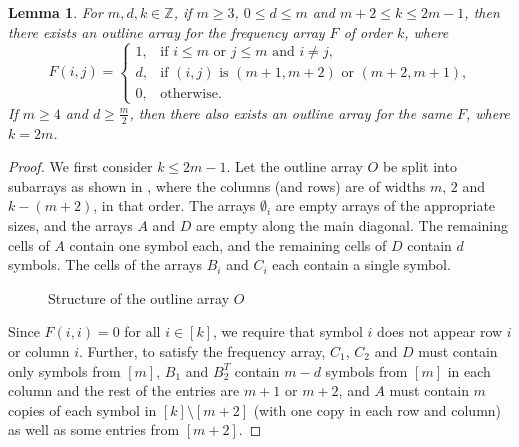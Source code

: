 \documentclass[preprint,nonatbib]{elsarticle}
\newtheorem{lemma}[theorem]{Lemma}
\theoremstyle{definition}
\numberwithin{equation}{section}
\begin{document}
\begin{lemma}
\label{lemma: freq array with d in corner}
    For $m,d,k\in\mathbb{Z}$, if $m\geq 3$, $0\leq d\leq m$ and $m+2\leq k\leq 2m-1$, then there exists an outline array for the frequency array $F$ of order $k$, where
    $$F(i,j) = \begin{cases}
        1, & \text{if $i\leq m$ or $j\leq m$ and $i\neq j$,}\\
        d, & \text{if $(i,j)$ is $(m+1,m+2)$ or $(m+2,m+1)$,}\\
        0, & \text{otherwise.}
    \end{cases}$$
    If $m\geq 4$ and $d\geq \frac{m}{2}$, then there also exists an outline array for the same $F$, where $k=2m$.
\end{lemma}
\begin{proof}
    We first consider $k\leq 2m-1$. Let the outline array $O$ be split into subarrays as shown in , where the columns (and rows) are of widths $m$, $2$ and $k-(m+2)$, in that order. The arrays $\emptyset_i$ are empty arrays of the appropriate sizes, and the arrays $A$ and $D$ are empty along the main diagonal. The remaining cells of $A$ contain one symbol each, and the remaining cells of $D$ contain $d$ symbols. The cells of the arrays $B_i$ and $C_i$ each contain a single symbol.
    \begin{figure}[h]
        \centering
        \caption{Structure of the outline array $O$}
        \label{fig: split outline array}
    \end{figure}

    Since $F(i,i) = 0$ for all $i\in[k]$, we require that symbol $i$ does not appear row $i$ or column $i$. Further, to satisfy the frequency array, $C_1$, $C_2$ and $D$ must contain only symbols from $[m]$, $B_1$ and $B_2^T$ contain $m-d$ symbols from $[m]$ in each column and the rest of the entries are $m+1$ or $m+2$, and $A$ must contain $m$ copies of each symbol in $[k]\setminus[m+2]$ (with one copy in each row and column) as well as some entries from $[m+2]$.


\end{proof}
\end{document}
